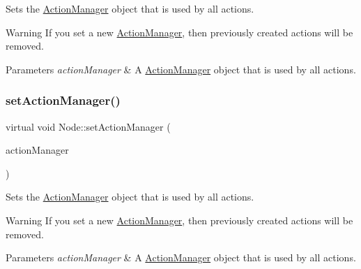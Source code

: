 Sets the \hyperlink{classActionManager}{Action\+Manager} object that is used by all actions.

\begin{DoxyWarning}{Warning}
If you set a new \hyperlink{classActionManager}{Action\+Manager}, then previously created actions will be removed.
\end{DoxyWarning}

\begin{DoxyParams}{Parameters}
{\em action\+Manager} & A \hyperlink{classActionManager}{Action\+Manager} object that is used by all actions. \\
\hline
\end{DoxyParams}
\mbox{\label{classNode_a8736ca61076cf9e27267c51884890348}} 
\subsubsection{\texorpdfstring{set\+Action\+Manager()}{setActionManager()}\hspace{0.1cm}{\footnotesize\ttfamily [2/2]}}
{\footnotesize\ttfamily virtual void Node\+::set\+Action\+Manager (\begin{DoxyParamCaption}\item[{\hyperlink{classActionManager}{Action\+Manager} $\ast$}]{action\+Manager }\end{DoxyParamCaption})\hspace{0.3cm}{\ttfamily [virtual]}}

Sets the \hyperlink{classActionManager}{Action\+Manager} object that is used by all actions.

\begin{DoxyWarning}{Warning}
If you set a new \hyperlink{classActionManager}{Action\+Manager}, then previously created actions will be removed.
\end{DoxyWarning}

\begin{DoxyParams}{Parameters}
{\em action\+Manager} & A \hyperlink{classActionManager}{Action\+Manager} object that is used by all actions. \\
\hline
\end{DoxyParams}
\mbox{\label{classNode_a7375e0112b9bf3e5ace5afb32a5cd044}} 
